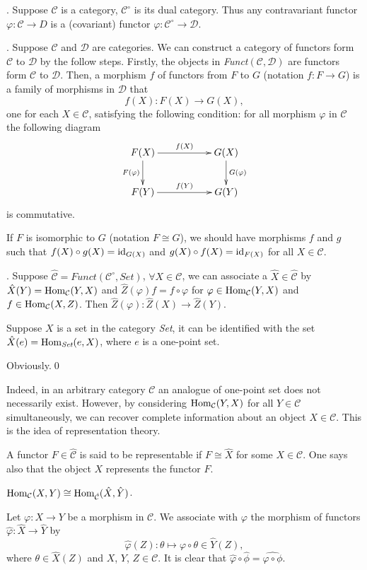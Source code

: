 \documentclass[9pt]{extarticle}
\newcommand{\cc}{\mathcal{C}}
\begin{document}
. Suppose $\cc$ is a category, $\cc^\circ$ is its dual category. Thus any contravariant functor $\varphi:\cc\to D$ is a (covariant) functor $\varphi:\cc^\circ\to \mathcal{D}$.

. Suppose $\cc$ and $\mathcal{D}$ are categories. We can construct a category of functors form $\cc$ to $\mathcal{D}$ by the follow steps. Firstly, the objects in \textit{Funct}$(\cc,\mathcal{D})$ are functors form $\cc$ to $\mathcal{D}$. Then, a morphism $f$ of functors from $F$ to $G$ (notation $f:F\to G$) is a family of morphisms in $\mathcal{D}$ that
\[
	f(X):F(X)\to G(X),
\]
one for each $X\in \cc$, satisfying the following condition: for all morphism $\varphi$ in $\cc$ the following diagram
\[
\begin{xy}
	\xymatrix
	{
		F(X)\ar[rr]^{f(X)} \ar[d]_{F(\varphi)}&&G(X) \ar[d]^{G(\varphi)}\\
		F(Y)\ar[rr]^{f(Y)}&&G(Y)
	}
\end{xy}
\]
is commutative.

If $F$ is isomorphic to $G$ (notation $F\cong G$), we should have morphisms $f$ and $g$ such that $f(X)\circ g(X)=\operatorname{id}_{G(X)}$ and $g(X)\circ f(X)=\operatorname{id}_{F(X)}$ for all $X\in \cc$.

. Suppose $\hat{\cc}=\textit{Funct}(\cc^\circ,\textit{Set})$, $\forall X\in \cc$, we can associate a $\hat{X}\in \hat{\cc}$ by $\hat{X}(Y)=\Hom_\cc(Y,X)$ and $\hat{Z}(\varphi)f=f\circ \varphi$ for $\varphi \in \Hom_\cc(Y,X)$ and $f\in \Hom_\cc(X,Z)$. Then $\hat{Z}(\varphi):\hat{Z}(X)\to \hat{Z}(Y)$.

\pro Suppose $X$ is a set in the category \textit{Set}, it can be identified with the set $\hat{X}(e)=\operatorname{Hom}_{\textit{Set}}(e,X)$, where $e$ is a one-point set.

\proof Obviously.\qed

Indeed, in an arbitrary category $\cc$ an analogue of one-point set does not necessarily exist. However, by considering $\Hom_{\cc}(Y,X)$ for all $Y\in \cc$ simultaneously, we can recover complete information about an object $X\in \cc$. This is the idea of representation theory.

\pro A functor $F\in \hat{\cc}$ is said to be representable if $F\cong \hat{X}$ for some $X\in \cc$. One says also that the object $X$ represents the functor $F$.

\theo $\Hom_\cc (X,Y)\cong \Hom_{\hat{\cc}} (\hat{X},\hat{Y})$.

\proof
	Let $\varphi:X\to Y$ be a morphism in $\cc$. We associate with $\varphi$ the morphism of functors $\hat{\varphi}:\hat{X}\to \hat{Y}$ by
	\[
		\hat{\varphi}(Z):\theta\mapsto\varphi\circ\theta\in \hat{Y}(Z),
	\]
	where $\theta\in \hat{X}(Z)$ and $X$, $Y$, $Z\in \cc$. It is clear that $\hat{\varphi}\circ \hat{\phi}=\widehat{\varphi\circ\phi}$.
\end{document}
